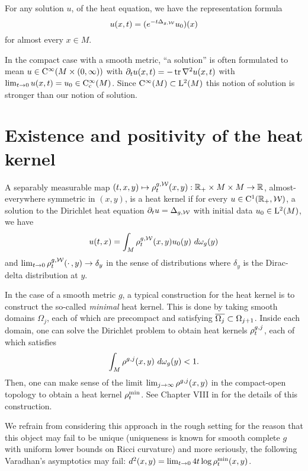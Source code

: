 \documentclass[a4paper, 12pt]{amsart}
\begin{document}
For any solution \(u\), of the heat equation, we have the representation formula
\[
u(x,t) = (e^{-t \Delta_{g,\cW}}u_0)(x)
\]
for almost every $x \in M$.
 
\begin{rem}
In the compact case with a smooth metric, ``a solution'' is often formulated to mean $u \in \Ck{\infty}( M \times (0, \infty))$
with $\partial_t u(x,t) = -\tr \nabla^2 u(x,t)$ with 
$\lim_{t \to 0} u(x,t) = u_0 \in \Ck[c]{\infty}(M)$.
Since $\Ck{\infty}(M) \subset \Lp{2}(M)$ this notion of solution is stronger than our notion of solution.
\end{rem}

\section{Existence and positivity of the heat kernel}

\begin{defn}
A separably measurable map $(t,x,y) \mapsto \hk^{g,\cW}_{t}(x,y): \R_+ \times M \times M \to \R$, 
almost-everywhere symmetric in $(x,y)$, is a heat kernel 
if for every $u \in \Ck{1}(\R_+, \cW)$, a solution to the Dirichlet heat equation 
$\partial_t u = \Delta_{g,\cW}$ with initial data $u_0 \in \Lp{2}(M)$, we have
\[
u(t,x) = \int_{M} \hk^{g,\cW}_t(x,y) u_0(y)\ d\omega_g(y)
\]
and
$\lim_{t \to 0} \hk_t^{g,\cW}(\mdot,y) \to \delta_y$ in the sense of distributions where $\delta_y$ is the Dirac-delta distribution at $y$.
\end{defn}

In the case of a smooth metric $g$, a typical construction for
the heat kernel is to construct the so-called \emph{minimal} heat kernel.
This is done by taking smooth domains $\Omega_j$, 
each of which are precompact and satisfying $\close{\Omega_j} \subset \Omega_{j+1}$. 
Inside each domain, one can solve the Dirichlet problem
to obtain heat kernels $\hk^{g,j}_{t}$, each of which
satisfies 
$$ \int_{M} \hk^{g,j}(x,y)\ d\omega_g(y) < 1.$$
Then, one can make sense of the limit $\lim_{j \to \infty} \hk^{g,j}(x,y)$
in the compact-open topology to obtain a heat kernel $\hk^{\min}_t$.
See Chapter VIII in \cite{Chavel} for the details
of this construction.

We refrain from considering this approach in the rough setting 
for the reason that this object may fail to be unique (uniqueness
is known for smooth complete $g$ with 
uniform lower bounds on Ricci curvature) and more seriously, the following
Varadhan's asymptotics may fail: 
$d^2(x,y) = \lim_{t \to 0} 4t \log \hk^{\min}_t(x,y)$.
\end{document}
